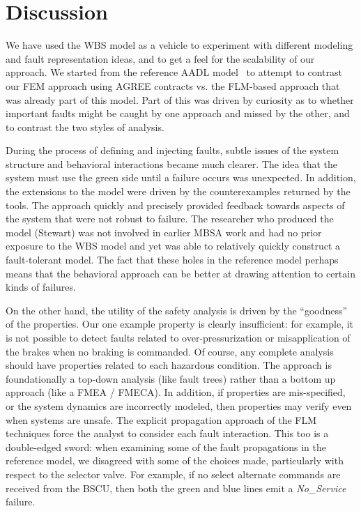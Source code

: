 \section{Discussion}
We have used the WBS model as a vehicle to experiment with different modeling and fault representation ideas, and to get a feel for the scalability of our approach.
%
We started from the reference AADL model~\cite{SEI:AADL} to attempt to contrast our FEM approach using AGREE contracts vs. the FLM-based approach that was already part of this model.  Part of this was driven by curiosity as to whether important faults might be caught by one approach and missed by the other, and to contrast the two styles of analysis.

During the process of defining and injecting faults, subtle issues of the system structure and behavioral interactions became much clearer.  The idea that the system must use the green side until a failure occurs was unexpected.  In addition, the extensions to the model were driven by the counterexamples returned by the tools.   The approach quickly and precisely provided feedback towards aspects of the system that were not robust to failure.  The researcher who produced the model (Stewart) was not involved in earlier MBSA work and had no prior exposure to the WBS model and yet was able to relatively quickly construct a fault-tolerant model.  The fact that these holes in the reference model perhaps means that the behavioral approach can be better at drawing attention to certain kinds of failures.

On the other hand, the utility of the safety analysis is driven by the ``goodness'' of the properties.  Our one example property is clearly insufficient: for example, it is not possible to detect faults related to over-pressurization or misapplication of the brakes when no braking is commanded.  Of course, any complete analysis should have properties related to each hazardous condition.  The approach is foundationally a top-down analysis (like fault trees) rather than a bottom up approach (like a FMEA / FMECA).  In addition, if properties are mis-specified, or the system dynamics are incorrectly modeled, then properties may verify even when systems are unsafe.  The explicit propagation approach of the FLM techniques force the analyst to consider each fault interaction.  This too is a double-edged sword: when examining some of the fault propagations in the reference model, we disagreed with some of the choices made, particularly with respect to the selector valve.  For example, if no select alternate commands are received from the BSCU, then both the green and blue lines emit a {\em No\_Service} failure.


